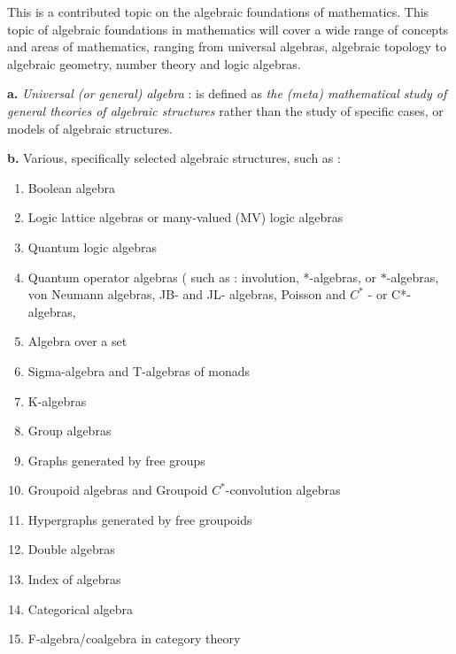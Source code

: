 \documentclass[12pt]{article}
\begin{document}
This is a contributed topic on the algebraic foundations of mathematics. This topic of algebraic foundations in mathematics will cover a wide range of concepts and areas of mathematics, ranging from universal algebras, algebraic topology to algebraic geometry, number theory and logic algebras. 

\textbf{a.}  \emph{Universal (or general) algebra} : is defined as \emph{the (meta) mathematical study of general theories of algebraic structures} rather than the study of specific cases, or models of algebraic structures. 

\textbf{b.}  Various, specifically selected algebraic structures, such as :

\begin{enumerate}
\item Boolean algebra 

\item Logic lattice algebras or many-valued (MV)  logic algebras 

\item Quantum logic algebras

\item Quantum operator algebras ( such as :   involution, *-algebras, or $*$-algebras, von Neumann algebras,
JB- and JL- algebras, Poisson and  $C^*$ - or C*- algebras, 

\item Algebra over a set 

\item Sigma-algebra and T-algebras of monads

\item K-algebras

\item Group algebras

\item Graphs generated by free groups

\item Groupoid algebras and Groupoid $C^*$-convolution algebras

\item Hypergraphs generated by free groupoids

\item Double algebras

\item Index of algebras

\item Categorical algebra

\item F-algebra/coalgebra in category theory


\end{enumerate}
\end{document}
